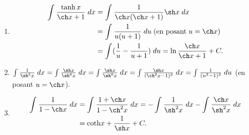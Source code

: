 {{\begin{enumerate}
\item
\begin{align*}\ensuremath
\int_{}^{}\frac{\tanh x}{\ch x+1}\;dx&=\int_{}^{}\frac{1}{\ch x(\ch x+1)}\sh x\;dx\\
 &=\int_{}^{}\frac{1}{u(u+1)}\;du\;(\mbox{en posant}\;u=\ch x)\\
 &=\int_{}^{}(\frac{1}{u}-\frac{1}{u+1})\;du=\ln\frac{\ch x}{\ch x+1}+C.
\end{align*}

\item $\int_{}^{}\frac{1}{\sh^5x}\;dx=\int_{}^{}\frac{\sh x}{\sh^6x}\;dx
=\int_{}^{}\frac{\sh x}{\sh^6x}\;dx=\int_{}^{}\frac{\sh x}{(\ch^2x-1)^3}\;dx=\int_{}^{}\frac{1}{(u^2-1)^3}\;du$ (en posant $u=\ch x$).

\item

\begin{align*}\ensuremath
\int_{}^{}\frac{1}{1-\ch x}\;dx&=\int_{}^{}\frac{1+\ch x}{1-\ch^2x}\;dx=-\int_{}^{}\frac{1}{\sh^2x}\;dx-\int_{}^{}\frac{\ch x}{\sh^2x}\;dx\\
 &=\mbox{coth}x+\frac{1}{\sh x}+C.
\end{align*}
\end{enumerate}}
}